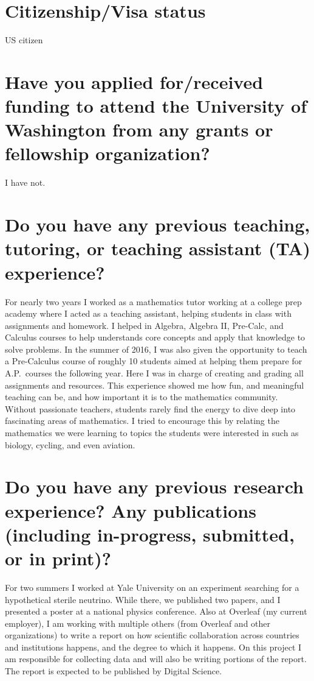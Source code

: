 \documentclass[11pt]{article}
\begin{document}
\section*{Citizenship/Visa status}

US citizen

\section*{Have you applied for/received funding to attend the University of Washington from any grants or fellowship organization?}

I have not.

\section*{Do you have any previous teaching, tutoring, or teaching assistant (TA) experience?} 

For nearly two years I worked as a mathematics tutor working at a college prep academy where I acted as a teaching assistant, helping students in class with assignments and homework. I helped in Algebra, Algebra II, Pre-Calc, and Calculus courses to help understands core concepts and apply that knowledge to solve problems. In the summer of 2016, I was also given the opportunity to teach a Pre-Calculus course of roughly 10 students aimed at helping them prepare for A.P.\ courses the following year. Here I was in charge of creating and grading all assignments and resources. This experience showed me how fun, and meaningful teaching can be, and how important it is to the mathematics community. Without passionate teachers, students rarely find the energy to dive deep into fascinating areas of mathematics. I tried to encourage this by relating the mathematics we were learning to topics the students were interested in such as biology, cycling, and even aviation.

\section*{Do you have any previous research experience? Any publications (including in-progress, submitted, or in print)?}

For two summers I worked at Yale University on an experiment searching for a hypothetical sterile neutrino. While there, we published two papers, and I presented a poster at a national physics conference. Also at Overleaf (my current employer), I am working with multiple others (from Overleaf and other organizations) to write a report on how scientific  collaboration across countries and institutions happens, and the degree to which it happens. On this project I am responsible for collecting data and will also be writing portions of the report. The report is expected to be published by Digital Science.
\end{document}
